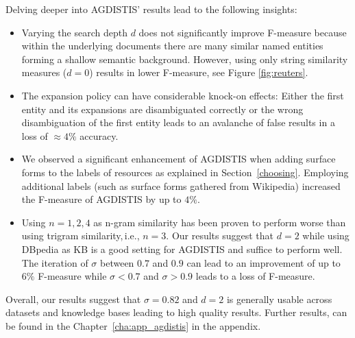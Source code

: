 Delving deeper into AGDISTIS' results lead to the following insights:
\begin{itemize}
\item Varying the search depth $d$ does not significantly improve \mbox{F-measure} because within the underlying documents there are many similar named entities forming a shallow semantic background. However, using only string similarity measures ($d=0$) results in lower F-measure, see Figure \ref{fig:reuters}. %
\item The expansion policy can have considerable knock-on effects: Either the first entity and its expansions are disambiguated correctly or the wrong disambiguation of the first entity leads to an avalanche of false results in a loss of $\approx 4\%$ accuracy.
\item We observed a significant enhancement of AGDISTIS when adding surface forms to the labels of resources as explained in Section~\ref{choosing}.
Employing additional labels (such as surface forms gathered from Wikipedia) increased the \mbox{F-measure} of AGDISTIS by up to $4\%$. 
\item Using $n=1,2,4$ as n-gram similarity has been proven to perform worse than using trigram similarity,\,i.e., $n=3$.
Our results suggest that $d=2$ while using DBpedia as \ac{KB} is a good setting for AGDISTIS and suffice to perform well. 
The iteration of $\sigma$ between $0.7$ and $0.9$ can lead to an improvement of up to $6\%$ \mbox{F-measure} while $\sigma<0.7$ and $\sigma>0.9$ leads to a loss of F-measure.
\end{itemize}


Overall, our results suggest that $\sigma=0.82$ and $d=2$ is generally usable across datasets and knowledge bases leading to high quality results.
Further results, can be found in the Chapter~\ref{cha:app_agdistis} in the appendix.


